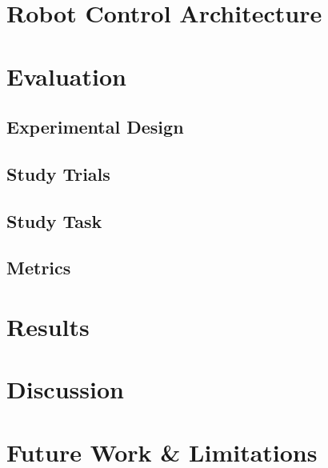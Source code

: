 \documentclass[conference]{IEEEtran}
\begin{document}
\section{Robot Control Architecture}

\section{Evaluation}
\subsection{Experimental Design}
\subsection{Study Trials}
\subsection{Study Task} 
\subsection{Metrics} 

\section{Results}

\section{Discussion}

\section{Future Work \& Limitations}
\end{document}
